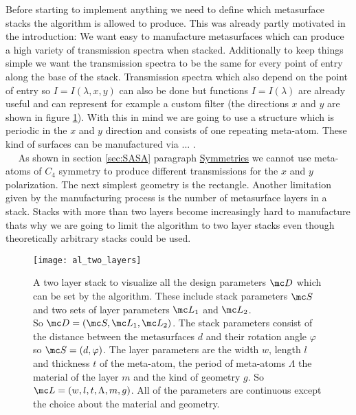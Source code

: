 Before starting to implement anything we need to define which metasurface stacks the algorithm is allowed to produce. This was already partly motivated in the introduction: We want easy to manufacture metasurfaces which can produce a high variety of transmission spectra when stacked. Additionally to keep things simple we want the transmission spectra to be the same for every point of entry along the base of the stack. Transmission spectra which also depend on the point of entry so $I = I(\lambda,x,y)$ can also be done \cite{Mueller2017} but functions $I = I(\lambda)$ are already useful and can represent for example a custom filter (the directions $x$ and $y$ are shown in figure \ref{fig:al:two_layers}).
With this in mind we are going to use a structure which is periodic in the
$x$ and $y$ direction and consists of one repeating meta-atom. These kind of surfaces can be manufactured via ... .
\\

$\quad$ As shown in section \ref{sec:SASA} paragraph \hyperref[sec:symmetries]{Symmetries} we cannot use meta-atoms of $C_4$ symmetry to produce different transmissions for the $x$ and $y$ polarization. The next simplest geometry is the rectangle. Another limitation given by the manufacturing process is the number of metasurface layers in a stack. Stacks with more than two layers become increasingly hard to manufacture thats why we are going to limit the algorithm to two layer stacks even though theoretically arbitrary stacks could be used.
\\

\begin{figure}[H]
    \centering
    \texttt{[image: al\_two\_layers]}
    \caption{A two layer stack to visualize all the design parameters
    $\mc D$ which can be set by the algorithm. These include stack parameters $\mc S$ and two sets of layer parameters $\mc L_1$ and $\mc L_2$.\\
    So $\mc D = (\mc S, \mc L_1, \mc L_2)$. The stack parameters consist of the distance between the metasurfaces $d$ and their rotation angle $\varphi$ so $\mc S = (d, \varphi)$. The layer parameters are the width $w$, length $l$ and thickness $t$ of the meta-atom, the period of meta-atoms $\Lambda$ the  material of the layer $m$ and the kind of geometry $g$. So $\mc L = (w,l,t,\Lambda,m,g)$. All of the parameters are continuous except the choice about the material and geometry.}
    \label{fig:al:two_layers}
\end{figure}


